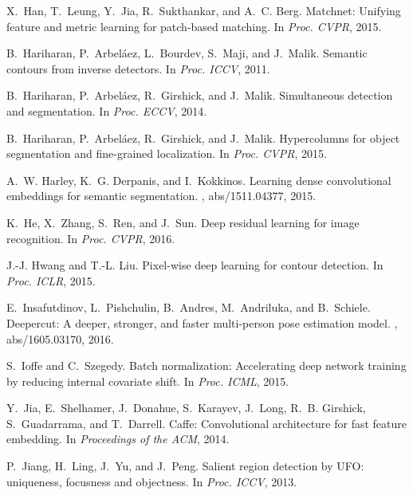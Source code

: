 \documentclass[10pt,twocolumn,letterpaper]{article}
\begin{document}
\begin{thebibliography}{100}
	X.~Han, T.~Leung, Y.~Jia, R.~Sukthankar, and A.~C. Berg.
	\newblock Matchnet: Unifying feature and metric learning for patch-based
	matching.
	\newblock In {\em Proc. {CVPR}}, 2015.
	
	B.~Hariharan, P.~Arbel{\'a}ez, L.~Bourdev, S.~Maji, and J.~Malik.
	\newblock Semantic contours from inverse detectors.
	\newblock In {\em Proc. {ICCV}}, 2011.
	
	B.~Hariharan, P.~Arbel{\'a}ez, R.~Girshick, and J.~Malik.
	\newblock Simultaneous detection and segmentation.
	\newblock In {\em Proc. {ECCV}}, 2014.
	
	B.~Hariharan, P.~Arbel{\'a}ez, R.~Girshick, and J.~Malik.
	\newblock Hypercolumns for object segmentation and fine-grained localization.
	\newblock In {\em Proc. {CVPR}}, 2015.
	
	A.~W. Harley, K.~G. Derpanis, and I.~Kokkinos.
	\newblock Learning dense convolutional embeddings for semantic segmentation.
	, abs/1511.04377, 2015.
	
	K.~He, X.~Zhang, S.~Ren, and J.~Sun.
	\newblock Deep residual learning for image recognition.
	\newblock In {\em Proc. {CVPR}}, 2016.
	
	J.-J. Hwang and T.-L. Liu.
	\newblock Pixel-wise deep learning for contour detection.
	\newblock In {\em Proc. {ICLR}}, 2015.
	
	E.~Insafutdinov, L.~Pishchulin, B.~Andres, M.~Andriluka, and B.~Schiele.
	\newblock Deepercut: {A} deeper, stronger, and faster multi-person pose
	estimation model.
	, abs/1605.03170, 2016.
	
	S.~Ioffe and C.~Szegedy.
	\newblock Batch normalization: Accelerating deep network training by reducing
	internal covariate shift.
	\newblock In {\em Proc. {ICML}}, 2015.
	
	Y.~Jia, E.~Shelhamer, J.~Donahue, S.~Karayev, J.~Long, R.~B. Girshick,
	S.~Guadarrama, and T.~Darrell.
	\newblock Caffe: Convolutional architecture for fast feature embedding.
	\newblock In {\em Proceedings of the {ACM}}, 2014.
	
	P.~Jiang, H.~Ling, J.~Yu, and J.~Peng.
	\newblock Salient region detection by {UFO:} uniqueness, focusness and
	objectness.
	\newblock In {\em Proc. {ICCV}}, 2013.
	

\end{thebibliography}
\end{document}
